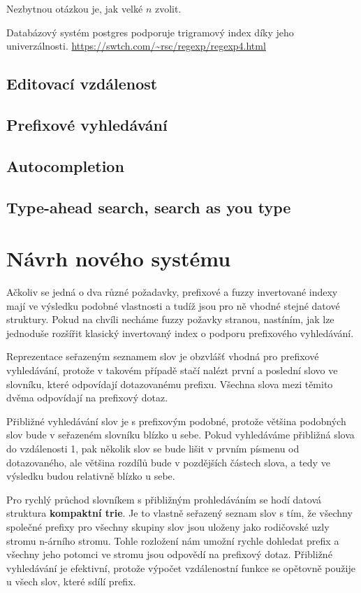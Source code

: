 \documentclass[11pt]{article}
\begin{document}
Nezbytnou otázkou je, jak velké $n$ zvolit. %

Databázový systém postgres podporuje trigramový index díky jeho univerzálnosti.
\url{https://swtch.com/~rsc/regexp/regexp4.html}

\subsection{Editovací vzdálenost}
\subsection{Prefixové vyhledávání}

\subsection{Autocompletion}

\subsection{Type-ahead search, search as you type}

\section{Návrh nového systému}
Ačkoliv se jedná o dva různé požadavky, prefixové a fuzzy invertované indexy
mají ve výsledku podobné vlastnosti a tudíž jsou pro ně vhodné stejné datové
struktury. Pokud na chvíli necháme fuzzy požavky stranou, nastíním, jak lze
jednoduše rozšířit klasický invertovaný index o podporu prefixového
vyhledávání.

Reprezentace seřazeným seznamem slov je obzvlášť vhodná pro prefixové
vyhledávání, protože v takovém případě stačí nalézt první a poslední slovo ve
slovníku, které odpovídají dotazovanému prefixu. Všechna slova mezi těmito
dvěma odpovídají na prefixový dotaz.

Přibližné vyhledávání slov je s prefixovým podobné, protože většina podobných
slov bude v seřazeném slovníku blízko u sebe. Pokud vyhledáváme přibližná slova
do vzdálenosti 1, pak několik slov se bude lišit v prvním písmenu od
dotazovaného, ale většina rozdílů bude v pozdějších částech slova, a tedy ve
výsledku budou relativně blízko u sebe.

Pro rychlý průchod slovníkem s přibližným prohledáváním se hodí datová
struktura \textbf{kompaktní trie}. Je to vlastně seřazený seznam slov s tím, že
všechny společné prefixy pro všechny skupiny slov jsou uloženy jako rodičovské
uzly stromu n-árního stromu. Tohle rozložení nám umožní rychle dohledat prefix
a všechny jeho potomci ve stromu jsou odpovědí na prefixový dotaz. Přibližné
vyhledávání je efektivní, protože výpočet vzdálenostní funkce se opětovně
použije u všech slov, které sdílí prefix.
\end{document}
